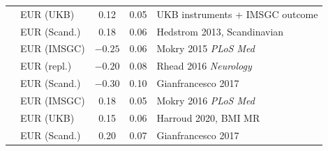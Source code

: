 \documentclass{article}
\begin{document}
\begin{table}[h]
\begin{tabular}{@{}llccp{4.5cm}@{}}
& EUR (UKB) & 0.12 & 0.05 & UKB instruments + IMSGC outcome \\
& EUR (Scand.) & 0.18 & 0.06 & Hedstrom 2013, Scandinavian \\
\midrule
{}
& EUR (IMSGC) & $-0.25$ & 0.06 & Mokry 2015 \emph{PLoS Med} \\
& EUR (repl.) & $-0.20$ & 0.08 & Rhead 2016 \emph{Neurology} \\
& EUR (Scand.) & $-0.30$ & 0.10 & Gianfrancesco 2017 \\
\midrule
{}
& EUR (IMSGC) & 0.18 & 0.05 & Mokry 2016 \emph{PLoS Med} \\
& EUR (UKB) & 0.15 & 0.06 & Harroud 2020, BMI MR \\
& EUR (Scand.) & 0.20 & 0.07 & Gianfrancesco 2017 \\
\bottomrule
\end{tabular}
\end{table}
\end{document}

